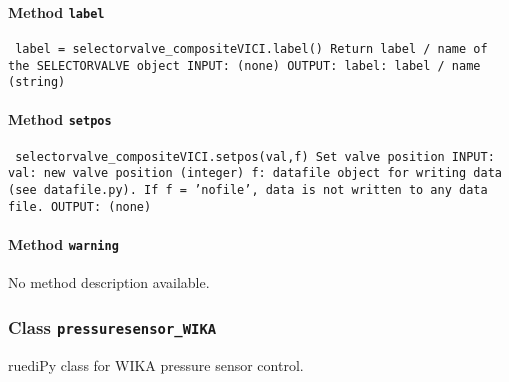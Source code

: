 \paragraph{Method \texttt{label}}
\vspace{1ex}
\texttt{\newline
label = selectorvalve_compositeVICI.label()\newline
\newline
Return label / name of the SELECTORVALVE object\newline
\newline
INPUT:\newline
(none)\newline
\newline
OUTPUT:\newline
label: label / name (string)\newline
\newline
}

\paragraph{Method \texttt{setpos}}
\vspace{1ex}
\texttt{\newline
selectorvalve_compositeVICI.setpos(val,f)\newline
\newline
Set valve position\newline
\newline
INPUT:\newline
val: new valve position (integer)\newline
f: datafile object for writing data (see datafile.py). If f = 'nofile', data is not written to any data file.\newline
\newline
OUTPUT:\newline
(none)\newline
\newline
}

\paragraph{Method \texttt{warning}}
\vspace{1ex}
No method description available.\par

\subsubsection{Class \texttt{pressuresensor_WIKA}}
\par
ruediPy class for WIKA pressure sensor control.\par

